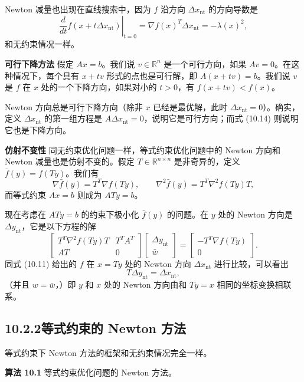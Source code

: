 \documentclass[UTF8,12pt,a4paper,fontset=fandol]{ctexart}
\begin{document}
Newton 减量也出现在直线搜索中，因为 $f$ 沿方向 $\Delta x_{\mathrm{nt}}$ 的方向导数是
\begin{equation}
\left.\frac{d}{dt}f(x+t\Delta x_{\mathrm{nt}})\right|_{t=0}
=\nabla f(x)^T\Delta x_{\mathrm{nt}}=-\lambda(x)^2,
\tag{10.14}
\end{equation}
和无约束情况一样。

\noindent\textbf{可行下降方法}\quad
假定 $Ax=b$。我们说 $v\in\mathbb{R}^n$ 是一个可行方向，如果 $Av=0$。在这种情况下，每个具有 $x+tv$ 形式的点也是可行解，即 $A(x+tv)=b$。我们说 $v$ 是 $f$ 在 $x$ 处的一个下降方向，如果对小的 $t>0$，有 $f(x+tv)<f(x)$。

Newton 方向总是可行下降方向（除非 $x$ 已经是最优解，此时 $\Delta x_{\mathrm{nt}}=0$）。确实，定义 $\Delta x_{\mathrm{nt}}$ 的第一组方程是 $A\Delta x_{\mathrm{nt}}=0$，说明它是可行方向；而式 (10.14) 则说明它也是下降方向。

\noindent\textbf{仿射不变性}\quad
同无约束优化问题一样，等式约束优化问题中的 Newton 方向和 Newton 减量也是仿射不变的。假定 $T\in\mathbb{R}^{n\times n}$ 是非奇异的，定义 $\bar{f}(y)=f(Ty)$。我们有
\[
\nabla \bar{f}(y)=T^T\nabla f(Ty),\qquad
\nabla^2\bar{f}(y)=T^T\nabla^2 f(Ty)T,
\]
而等式约束 $Ax=b$ 则成为 $ATy=b$。

现在考虑在 $ATy=b$ 的约束下极小化 $\bar{f}(y)$ 的问题。在 $y$ 处的 Newton 方向是 $\Delta y_{\mathrm{nt}}$，它是以下方程的解
\[
\begin{bmatrix}
T^T\nabla^2 f(Ty)T & T^TA^T\\
AT & 0
\end{bmatrix}
\begin{bmatrix}
\Delta y_{\mathrm{nt}}\\
\bar{w}
\end{bmatrix}
=
\begin{bmatrix}
-T^T\nabla f(Ty)\\
0
\end{bmatrix}.
\]
同式 (10.11) 给出的 $f$ 在 $x=Ty$ 处的 Newton 方向 $\Delta x_{\mathrm{nt}}$ 进行比较，可以看出
\[
T\Delta y_{\mathrm{nt}}=\Delta x_{\mathrm{nt}},
\]
（并且 $w=\bar{w}$，）即 $y$ 和 $x$ 处的 Newton 方向由和 $Ty=x$ 相同的坐标变换相联系。

\subsection*{10.2.2\quad 等式约束的 Newton 方法}

等式约束下 Newton 方法的框架和无约束情况完全一样。

\noindent\textbf{算法 10.1}\quad
等式约束优化问题的 Newton 方法。
\end{document}
